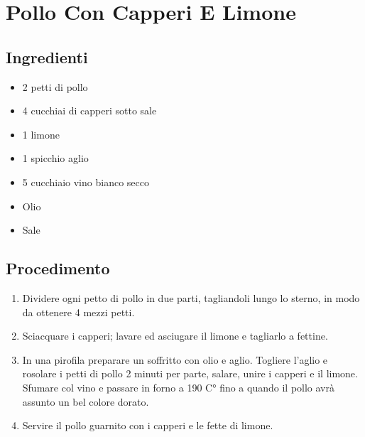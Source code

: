\section{Pollo Con Capperi E Limone}
\subsection{Ingredienti}
\begin{itemize}
\item 2 petti di pollo   
\item 4 cucchiai di capperi sotto sale  
\item 1 limone  
\item 1 spicchio aglio  
\item 5 cucchiaio vino bianco secco  
\item Olio  
\item Sale
\end{itemize}
\subsection{Procedimento}
\begin{enumerate}
\item  Dividere ogni petto di pollo in due parti, tagliandoli lungo lo sterno, in modo da ottenere 4 mezzi petti.  
\item  Sciacquare i capperi; lavare ed asciugare il limone e tagliarlo a fettine.  
\item  In una pirofila preparare un soffritto con olio e aglio. Togliere l'aglio e rosolare i petti di pollo 2 minuti per parte, salare, unire i capperi e il limone. Sfumare col vino e passare in forno a 190 C° fino a quando il pollo avrà assunto un bel colore dorato.  
\item  Servire il pollo guarnito con i capperi e le fette di limone.
\end{enumerate}
